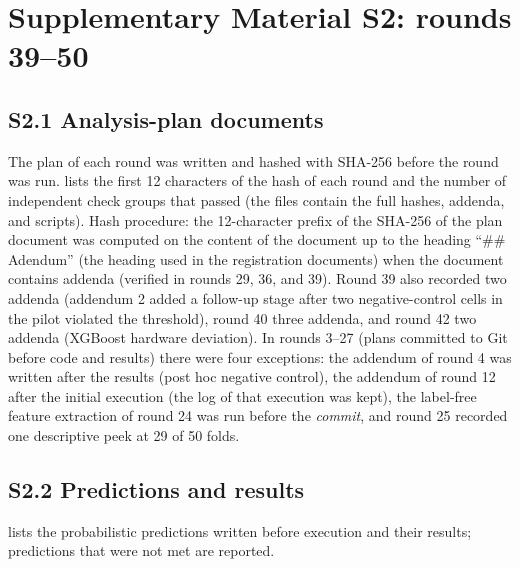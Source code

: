 \setcounter{table}{0}\setcounter{figure}{0}
\setlength{\LTpre}{6pt}\setlength{\LTpost}{6pt}
\renewcommand{\thetable}{S2.\arabic{table}}
\renewcommand{\thefigure}{S2.\arabic{figure}}

\section*{Supplementary Material S2: rounds 39--50}\label{sec:s2}

\subsection*{S2.1 Analysis-plan documents}
The plan of each round was written and hashed with SHA-256 before the round was run.  lists the first 12 characters of the hash of each round and the number of independent check groups that passed (the files  contain the full hashes, addenda, and scripts). Hash procedure: the 12-character prefix of the SHA-256 of the plan document was computed on the content of the document up to the heading ``\#\# Adendum'' (the heading used in the registration documents) when the document contains addenda (verified in rounds 29, 36, and 39).
Round 39 also recorded two addenda (addendum 2 added a follow-up stage after two negative-control cells in the pilot violated the threshold), round 40 three addenda, and round 42 two addenda (XGBoost hardware deviation).
In rounds 3--27 (plans committed to Git before code and results) there were four exceptions: the addendum of round 4 was written after the results (post hoc negative control), the addendum of round 12 after the initial execution (the log of that execution was kept), the label-free feature extraction of round 24 was run before the \textit{commit}, and round 25 recorded one descriptive peek at 29 of 50 folds.

\subsection*{S2.2 Predictions and results}
 lists the probabilistic predictions written before execution and their results; predictions that were not met are reported.

